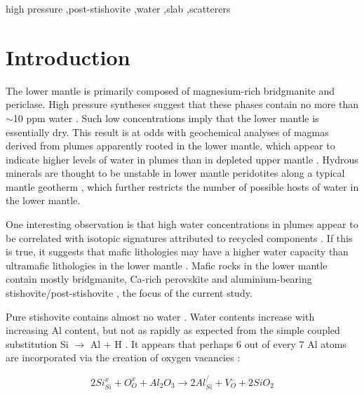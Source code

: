 \documentclass[review]{elsarticle}
\begin{document}
\begin{frontmatter}
\begin{abstract}
  
  
\end{abstract}

\begin{keyword}
high pressure \sep post-stishovite \sep water \sep slab \sep scatterers
\end{keyword}

\end{frontmatter}

\linenumbers

\section{Introduction}
The lower mantle is primarily composed of magnesium-rich bridgmanite and periclase. High pressure syntheses suggest that these phases contain no more than $\sim$10 ppm water \citep[e.g.][]{KB2006}. Such low concentrations imply that the lower mantle is essentially dry. This result is at odds with geochemical analyses of magmas derived from plumes apparently rooted in the lower mantle, which appear to indicate higher levels of water in plumes than in depleted upper mantle \citep{DLLS2002,SHLP2002}. Hydrous minerals are thought to be unstable in lower mantle peridotites along a typical mantle geotherm \citep{Walteretal2015}, which further restricts the number of possible hosts of water in the lower mantle.

One interesting observation is that high water concentrations in plumes appear to be correlated with isotopic signatures attributed to recycled components \citep{SHH2005}. If this is true, it suggests that mafic lithologies may have a higher water capacity than ultramafic lithologies in the lower mantle \citep{Pamatoetal2015}. Mafic rocks in the lower mantle contain mostly bridgmanite, Ca-rich perovskite and aluminium-bearing stishovite/post-stishovite \citep{HHPH2013}, the focus of the current study.

Pure stishovite contains almost no water \citep{LLSHLOB2007}. Water contents increase with increasing Al content, but not as rapidly as expected from the simple coupled substitution Si $\rightarrow$ Al $+$ H \citep{SSP1995,CK2002,HTSO2005,LLSHLOB2007}. It appears that perhaps 6 out of every 7 Al atoms are incorporated via the creation of oxygen vacancies \citep{BBB2006}:

\begin{equation}
  2Si^x_{Si} + O^x_O + Al_2O_3 \rightarrow 2Al^/_{Si} + V^{..}_O + 2SiO_2
  \label{r:O_vac}
\end{equation}
\end{document}

